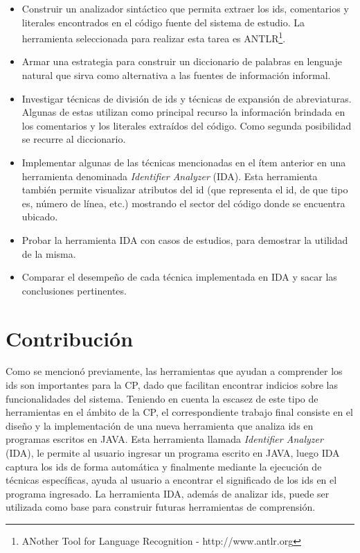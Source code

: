 \begin{itemize}
\itemsep0em%
\item Construir un analizador sintáctico que permita extraer los ids, comentarios y literales encontrados en el código fuente del sistema de estudio. La herramienta seleccionada para realizar esta tarea es ANTLR\footnote[1]{ANother Tool for Language Recognition - http://www.antlr.org}.

\item Armar una estrategia para construir un diccionario de palabras en lenguaje natural que sirva como alternativa a las fuentes de información informal.

\item Investigar técnicas de división de ids y técnicas de expansión de abreviaturas. Algunas de estas utilizan como principal recurso la información brindada en los comentarios y los literales extraídos del código. Como segunda posibilidad se recurre al diccionario.

\item Implementar algunas de las técnicas mencionadas en el ítem anterior en una herramienta denominada \textit{Identifier Analyzer} (IDA). Esta herramienta también permite visualizar atributos del id (que representa el id, de que tipo es, número de línea, etc.) mostrando el sector del código donde se encuentra ubicado.

\item Probar la herramienta IDA con casos de estudios, para demostrar la utilidad de la misma.

\item Comparar el desempeño de cada técnica implementada en IDA y sacar las conclusiones pertinentes.

\end{itemize}

\pagebreak 
\section{Contribución}

Como se mencionó previamente, las herramientas que ayudan a comprender los ids son importantes para la CP, dado que facilitan encontrar indicios sobre las funcionalidades del sistema.
Teniendo en cuenta la escasez de este tipo de herramientas en el ámbito de la CP, el correspondiente trabajo final consiste en el diseño y la implementación de una nueva herramienta que analiza ids en programas escritos en JAVA. Esta herramienta llamada \textit{Identifier Analyzer} (IDA), le permite al usuario ingresar un programa escrito en \mbox{JAVA}, luego IDA captura los ids de forma automática y finalmente mediante la ejecución de técnicas específicas, ayuda al usuario a encontrar el significado de los ids en el programa ingresado. 
La herramienta IDA, además de analizar ids, puede ser utilizada como base para construir futuras herramientas de comprensión.

